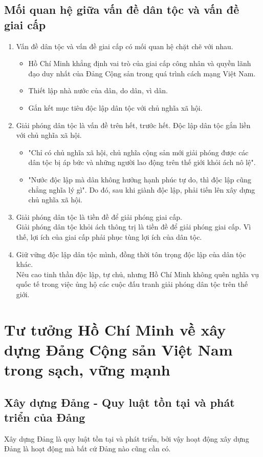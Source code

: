 \documentclass{article}
\begin{document}
	\subsection{Mối quan hệ giữa vấn đề dân tộc và vấn đề giai cấp}
	\begin{enumerate}
		\item Vấn đề dân tộc và vấn đề giai cấp có mối quan hệ chặt chẽ với nhau.
		\begin{itemize}
			\item Hồ Chí Minh khẳng định vai trò của giai cấp công nhân và quyền lãnh đạo duy nhất của Đảng Cộng sản trong quá trình cách mạng Việt Nam.
			\item Thiết lập nhà nước của dân, do dân, vì dân.
			\item Gắn kết mục tiêu độc lập dân tộc với chủ nghĩa xã hội.
		\end{itemize}
		\item Giải phóng dân tộc là vấn đề trên hết, trước hết. Độc lập dân tộc gắn liền với chủ nghĩa xã hội.
		\begin{itemize}
			\item "Chỉ có chủ nghĩa xã hội, chủ nghĩa cộng sản mới giải phóng được các dân tộc bị áp bức và những người lao động trên thế giới khỏi ách nô lệ".
			\item "Nước độc lập mà dân không hưởng hạnh phúc tự do, thì độc lập cũng chẳng nghĩa lý gì". Do đó, sau khi giành độc lập, phải tiến lên xây dựng chủ nghĩa xã hội.
		\end{itemize}
		\item Giải phóng dân tộc là tiền đề để giải phóng giai cấp.\\
		Giải phóng dân tộc khỏi ách thông trị là tiền đề để giải phóng giai cấp. Vì thế, lợi ích của giai cấp phải phục tùng lợi ích của dân tộc.
		\item Giữ vững độc lập dân tộc mình, đồng thời tôn trọng độc lập của dân tộc khác.\\
		Nêu cao tinh thần độc lập, tự chủ, nhưng Hồ Chí Minh không quên nghĩa vụ quốc tế trong việc ủng hộ các cuộc đấu tranh giải phóng dân tộc trên thế giới.
	\end{enumerate}

	\section{Tư tưởng Hồ Chí Minh về xây dựng Đảng Cộng sản Việt Nam trong sạch, vững mạnh}
	\subsection{Xây dựng Đảng - Quy luật tồn tại và phát triển của Đảng}
	Xây dựng Đảng là quy luật tồn tại và phát triển, bởi vậy hoạt động xây dựng Đảng là hoạt động mà bất cứ Đảng nào cũng cần có.\\
\end{document}
